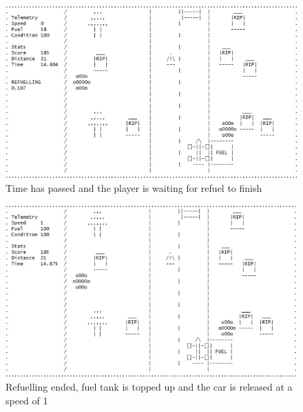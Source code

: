 \documentclass{article}
\begin{document}
\begin{figure}[!ht]
	\begin{center}
	\includegraphics[width=0.63\paperwidth]{images/fuel_test_refuelend}
	\caption{Time has passed and the player is waiting for refuel to finish}
	\label{fig:fuel_test_refuelend} 
	\end{center}
\end{figure}
\begin{figure}[!ht]
	\begin{center}
	\includegraphics[width=0.63\paperwidth]{images/fuel_test_refuelrelease}
	\caption{Refuelling ended, fuel tank is topped up and the car is released at a speed of 1}
	\label{fig:fuel_test_refuelrelease} 
	\end{center}
\end{figure}

\clearpage

\end{document}
